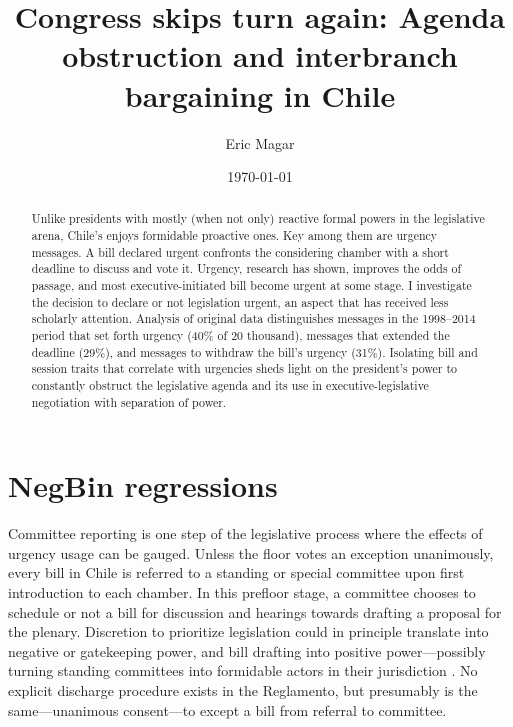 \documentclass[letter,12pt]{article}
\begin{document}
\title{Congress skips turn again: Agenda obstruction and interbranch bargaining in Chile}
\author{Eric Magar}
\date{\today}
\maketitle

\begin{abstract}
Unlike presidents with mostly (when not only) reactive formal powers in the legislative arena, Chile's enjoys formidable proactive ones. Key among them are urgency messages. A bill declared urgent confronts the considering chamber with a short deadline to discuss and vote it. Urgency, research has shown, improves the odds of passage, and most executive-initiated bill become urgent at some stage. I investigate the decision to declare or not legislation urgent, an aspect that has received less scholarly attention. Analysis of original data distinguishes messages in the 1998--2014 period that set forth urgency (40\% of 20 thousand), messages that extended the deadline (29\%), and messages to withdraw the bill's urgency (31\%). Isolating bill and session traits that correlate with urgencies sheds light on the president's power to constantly obstruct the legislative agenda and its use in executive-legislative negotiation with separation of power.  
\end{abstract}

\onehalfspacing


\section{NegBin regressions}

Committee reporting is one step of the legislative process where the effects of urgency usage can be gauged. Unless the floor votes an exception unanimously, every bill in Chile is referred to a standing or special committee upon first introduction to each chamber. In this prefloor stage, a committee chooses to schedule or not a bill for discussion and hearings towards drafting a proposal for the plenary. Discretion to prioritize legislation could in principle translate into negative or gatekeeping power, and bill drafting into positive power---possibly turning standing committees into formidable actors in their jurisdiction \citep{cox.mccubbins.1993,fenno.1973,shepsle.weingast.1987}. No explicit discharge procedure exists in the Reglamento, but presumably is the same---unanimous consent---to except a bill from referral to committee. 
\end{document}
